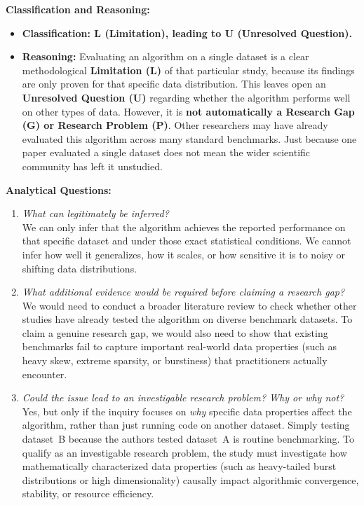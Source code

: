 \documentclass[11pt]{article}
\begin{document}
\noindent\textbf{Classification and Reasoning:}
\begin{itemize}[leftmargin=1.5em]
    \item \textbf{Classification: L (Limitation), leading to U (Unresolved Question).}
    \item \textbf{Reasoning:} Evaluating an algorithm on a single dataset is a clear methodological \textbf{Limitation (L)} of that particular study, because its findings are only proven for that specific data distribution. This leaves open an \textbf{Unresolved Question (U)} regarding whether the algorithm performs well on other types of data. However, it is \textbf{not automatically a Research Gap (G) or Research Problem (P)}. Other researchers may have already evaluated this algorithm across many standard benchmarks. Just because one paper evaluated a single dataset does not mean the wider scientific community has left it unstudied.
\end{itemize}

\noindent\textbf{Analytical Questions:}
\begin{enumerate}[leftmargin=1.5em]
    \item \textit{What can legitimately be inferred?} \\
    We can only infer that the algorithm achieves the reported performance on that specific dataset and under those exact statistical conditions. We cannot infer how well it generalizes, how it scales, or how sensitive it is to noisy or shifting data distributions.
    \item \textit{What additional evidence would be required before claiming a research gap?} \\
    We would need to conduct a broader literature review to check whether other studies have already tested the algorithm on diverse benchmark datasets. To claim a genuine research gap, we would also need to show that existing benchmarks fail to capture important real-world data properties (such as heavy skew, extreme sparsity, or burstiness) that practitioners actually encounter.
    \item \textit{Could the issue lead to an investigable research problem? Why or why not?} \\
    Yes, but only if the inquiry focuses on \textit{why} specific data properties affect the algorithm, rather than just running code on another dataset. Simply testing dataset~B because the authors tested dataset~A is routine benchmarking. To qualify as an investigable research problem, the study must investigate how mathematically characterized data properties (such as heavy-tailed burst distributions or high dimensionality) causally impact algorithmic convergence, stability, or resource efficiency.
\end{enumerate}
\end{document}
